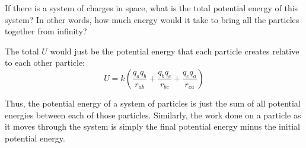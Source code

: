 \documentclass[12pt]{article}
\begin{document}
If there is a system of charges in space, what is the total potential energy of this system?
In other words, how much energy would it take to bring all the particles together from infinity?

The total $U$ would just be the potential energy that each particle creates relative to each
other particle:
\begin{equation*}
  U = k\left(\frac{q_aq_b}{r_{ab}} + \frac{q_bq_c}{r_{bc}} + \frac{q_cq_a}{r_{ca}}\right)
\end{equation*}

Thus, the potential energy of a system of particles is just the sum of all potential energies
between each of those particles. Similarly, the work done on a particle as it moves through
the system is simply the final potential energy minus the initial potential energy.
\end{document}
